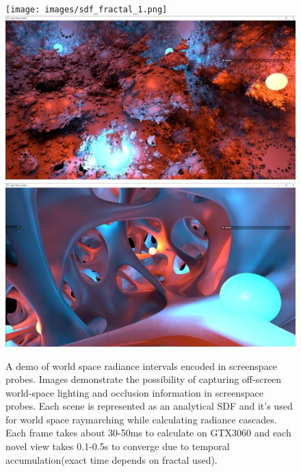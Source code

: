 \documentclass{jcgt}
\begin{document}
\begin{figure}[htb]
  \texttt{[image: images/sdf\_fractal\_1.png]}
  \includegraphics[width=0.49\columnwidth]{images/sdf_fractal_2.png}
  \includegraphics[width=0.49\columnwidth]{images/sdf_goopy2.png}
  \caption{\label{fig:sdf_world_space}
     A demo of world space radiance intervals encoded in screenspace probes. Images demonstrate the possibility of capturing off-screen world-space lighting and occlusion information in screenspace probes. Each scene is represented as an analytical SDF and it's used for world space raymarching while calculating radiance cascades. Each frame takes about 30-50ms to calculate on GTX3060 and each novel view takes 0.1-0.5s to converge due to temporal accumulation(exact time depends on fractal used).}
\end{figure}
\end{document}
